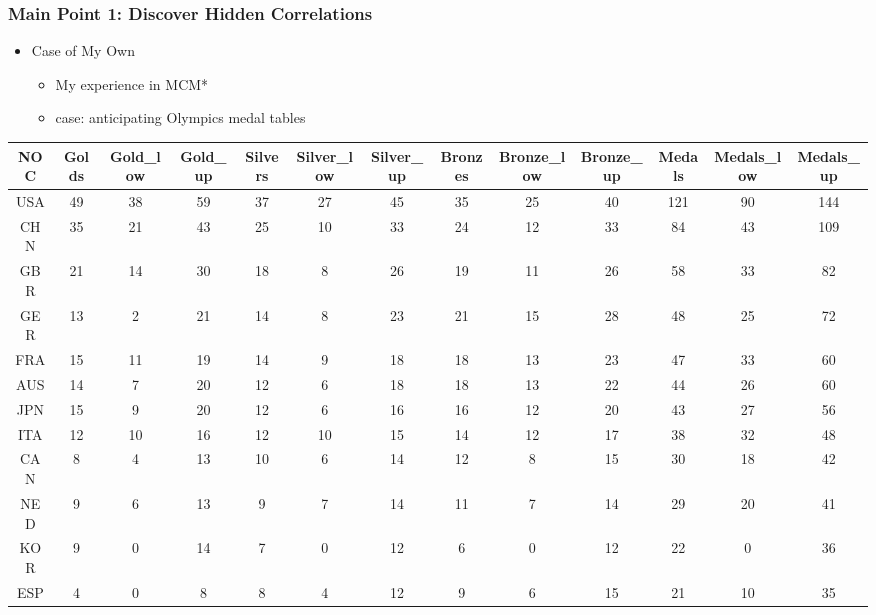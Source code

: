 \documentclass{beamer}
\begin{document}
\begin{frame}
\frametitle{Main Point 1: Discover Hidden Correlations}
\begin{minipage}{\textwidth}
{\linespread{1.3}
\begin{itemize}
    \item {\Large Case of My Own}
    \begin{itemize}
        \item {\large My experience in MCM*}
        \item {\large case: anticipating Olympics medal tables}
    \end{itemize}
\end{itemize}
}

\vspace{0.7em}

\centering
\tiny
\begin{tabular}{|c|c|c|c|c|c|c|c|c|c|c|c|c|}
\hline
\textbf{NOC} & \textbf{Golds} & \textbf{Gold\_low} & \textbf{Gold\_up} & \textbf{Silvers} & \textbf{Silver\_low} & \textbf{Silver\_up} & \textbf{Bronzes} & \textbf{Bronze\_low} & \textbf{Bronze\_up} & \textbf{Medals} & \textbf{Medals\_low} & \textbf{Medals\_up} \\
\hline
        USA & 49 & 38 & 59 & 37 & 27 & 45 & 35 & 25 & 40 & 121 & 90 & 144 \\
        CHN & 35 & 21 & 43 & 25 & 10 & 33 & 24 & 12 & 33 & 84 & 43 & 109 \\
        GBR & 21 & 14 & 30 & 18 & 8 & 26 & 19 & 11 & 26 & 58 & 33 & 82 \\
        GER & 13 & 2 & 21 & 14 & 8 & 23 & 21 & 15 & 28 & 48 & 25 & 72 \\
        FRA & 15 & 11 & 19 & 14 & 9 & 18 & 18 & 13 & 23 & 47 & 33 & 60 \\
        AUS & 14 & 7 & 20 & 12 & 6 & 18 & 18 & 13 & 22 & 44 & 26 & 60 \\
        JPN & 15 & 9 & 20 & 12 & 6 & 16 & 16 & 12 & 20 & 43 & 27 & 56 \\
        ITA & 12 & 10 & 16 & 12 & 10 & 15 & 14 & 12 & 17 & 38 & 32 & 48 \\
        CAN & 8 & 4 & 13 & 10 & 6 & 14 & 12 & 8 & 15 & 30 & 18 & 42 \\
        NED & 9 & 6 & 13 & 9 & 7 & 14 & 11 & 7 & 14 & 29 & 20 & 41 \\
        KOR & 9 & 0 & 14 & 7 & 0 & 12 & 6 & 0 & 12 & 22 & 0 & 36 \\
        ESP & 4 & 0 & 8 & 8 & 4 & 12 & 9 & 6 & 15 & 21 & 10 & 35 \\

\end{tabular}
\end{minipage}
\end{frame}
\end{document}
